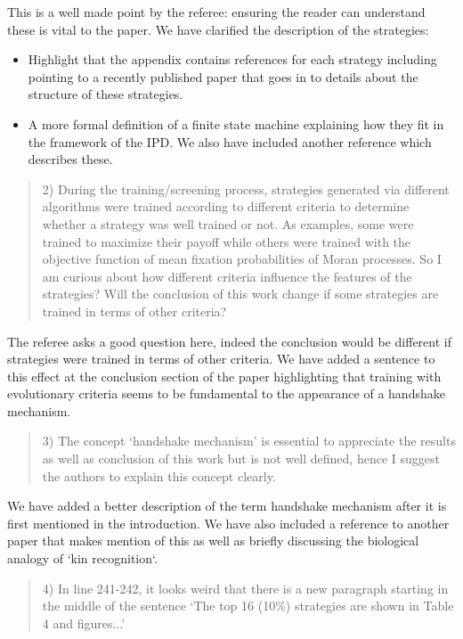 \documentclass[a4]{article}
\begin{document}
This is a well made point by the referee: ensuring the reader can understand
these is vital to the paper.
We have clarified the description of the strategies:

\begin{itemize}
    \item Highlight that the appendix contains references for each strategy
        including pointing to a recently published paper that goes in to details
        about the structure of these strategies.
    \item A more formal definition of a finite state machine explaining how they
        fit in the framework of the IPD. We also have included another reference
        which describes these.
\end{itemize}

\begin{quote}
  2) During the training/screening process, strategies generated via different
  algorithms were trained according to different criteria to determine whether a
  strategy was well trained or not. As examples, some were trained to maximize
  their payoff while others were trained with the objective function of mean
  fixation probabilities of Moran processes. So I am curious about how different
  criteria influence the features of the strategies? Will the conclusion of this
  work change if some strategies are trained in terms of other criteria?
\end{quote}

The referee asks a good question here, indeed the conclusion would be different
if strategies were trained in terms of other criteria. We have added a sentence
to this effect at the conclusion section of the paper highlighting that training
with evolutionary criteria seems to be fundamental to the appearance of a
handshake mechanism.

\begin{quote}
  3) The concept `handshake mechanism' is essential to appreciate the results as
  well as conclusion of this work but is not well defined, hence I suggest the
  authors to explain this concept clearly.
\end{quote}

We have added a better description of the term handshake mechanism after it is
first mentioned in the introduction. We have also included a reference to
another paper that makes mention of this as well as briefly discussing the
biological analogy of `kin recognition`.

\begin{quote}
  4) In line 241-242, it looks weird that there is a new paragraph starting in
  the middle of the sentence `The top 16 (10\%) strategies are shown in Table 4
  and figures...'
\end{quote}
\end{document}
